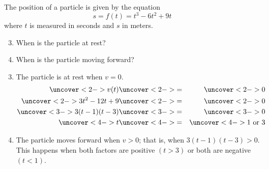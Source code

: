 \begin{frame}[t]
\begin{example}[Example 1, p. 171]
The position of a particle is given by the equation
\abovedisplayskip=0pt
\belowdisplayskip=0pt
\[
s = f(t) = t^3 - 6t^2 + 9t
\]
where $t$ is measured in seconds and $s$ in meters.
\begin{enumerate}
\setcounter{enumi}{2}
\item<1-| alert@2-4>  When is the particle at rest?
\item<1-| alert@5->  When is the particle moving forward? 
\end{enumerate}
\begin{enumerate}
\setcounter{enumi}{2}
\item<2->  The particle is at rest when $v = 0$.
\abovedisplayskip=0pt
\belowdisplayskip=0pt
\begin{eqnarray*}
\uncover<2->{%
v(t)%
}%
& \uncover<2->{ = } &%
\uncover<2->{%
0%
}\\%
\uncover<2->{%
3t^2 - 12 t + 9%
}%
& \uncover<2->{ = } &%
\uncover<2->{%
0%
}\\%
\uncover<3->{%
3(t - 1)(t - 3)%
}%
& \uncover<3->{ = } &%
\uncover<3->{%
0%
}\\%
\uncover<4->{%
t%
}%
& \uncover<4->{ = } &%
\uncover<4->{%
1 \textrm{ or } 3%
}\\%
\end{eqnarray*}
\vspace{-.4in}
\item<5->  The particle moves forward when $v > 0$; that is, when $3(t-1)(t-3) > 0$.  This happens when both factors are positive $(t > 3)$ or both are negative $(t < 1)$.
\end{enumerate}
\end{example}
\end{frame}


